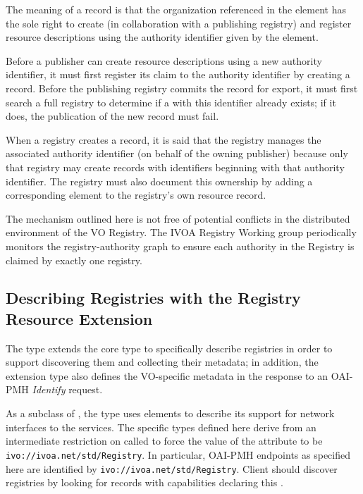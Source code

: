 \documentclass{ivoa}
\newcommand{\oaiop}[1]{\textit{#1}}
\begin{document}
The meaning of a  record is that the organization
referenced in the  element has the sole right to
create (in collaboration with a publishing registry) and register
resource descriptions using the authority identifier given by the
 element.

Before a publisher can create resource descriptions using a new
authority identifier, it must first register its claim to the authority
identifier by creating a  record.  Before the
publishing registry commits the record for export, it must first search
a full registry to determine if a  with this
identifier already exists; if it does, the publication of the new
 record must fail. 

When a registry creates a
 record, it is said that the registry manages the
associated authority identifier (on behalf of the owning publisher)
because only that registry may create records with identifiers beginning
with that authority identifier. The registry must also document this ownership
by adding a corresponding  element to the 
registry's own resource record.

The mechanism outlined here is not free of potential conflicts in the distributed
environment of the VO Registry.  The IVOA Registry Working group
periodically monitors the registry-authority graph to ensure each
authority in the Registry is claimed by exactly one registry.

\subsection{Describing Registries with the Registry Resource Extension}

\label{sect:resext}

The  type extends the core  type to
specifically describe registries in order to support discovering them
and collecting their metadata; in addition, the extension type also
defines the VO-specific metadata in the response to an OAI-PMH
\oaiop{Identify} request.  

As a subclass of , the 
type uses  elements to describe its support for
network interfaces to the services.  The specific types defined here
derive from an intermediate restriction on  called
 to force the value of the
 attribute to be \nolinkurl{ivo://ivoa.net/std/Registry}.
In particular, OAI-PMH endpoints as specified here are identified by
\nolinkurl{ivo://ivoa.net/std/Registry}.  Client should discover
registries by looking for records with capabilities declaring
this .
\end{document}
